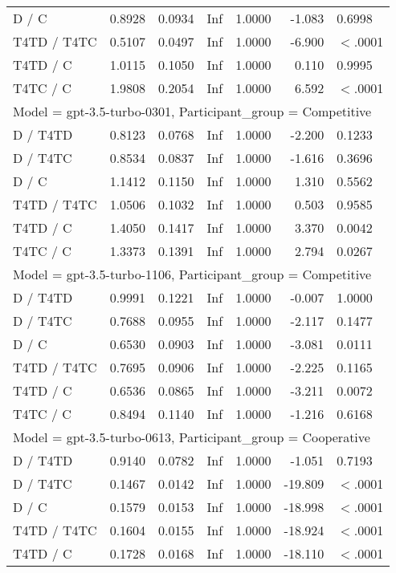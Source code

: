 \begin{table}[ht]
\begin{tabular}{lrrrrrl}
  D / C & 0.8928 & 0.0934 & Inf & 1.0000 & -1.083 & 0.6998 \\ 
  T4TD / T4TC & 0.5107 & 0.0497 & Inf & 1.0000 & -6.900 & $<$.0001 \\ 
  T4TD / C & 1.0115 & 0.1050 & Inf & 1.0000 & 0.110 & 0.9995 \\ 
  T4TC / C & 1.9808 & 0.2054 & Inf & 1.0000 & 6.592 & $<$.0001 \\ 
   \hline
\multicolumn{7}{l}{Model = gpt-3.5-turbo-0301, Participant_group = Competitive}\\
D / T4TD & 0.8123 & 0.0768 & Inf & 1.0000 & -2.200 & 0.1233 \\ 
  D / T4TC & 0.8534 & 0.0837 & Inf & 1.0000 & -1.616 & 0.3696 \\ 
  D / C & 1.1412 & 0.1150 & Inf & 1.0000 & 1.310 & 0.5562 \\ 
  T4TD / T4TC & 1.0506 & 0.1032 & Inf & 1.0000 & 0.503 & 0.9585 \\ 
  T4TD / C & 1.4050 & 0.1417 & Inf & 1.0000 & 3.370 & 0.0042 \\ 
  T4TC / C & 1.3373 & 0.1391 & Inf & 1.0000 & 2.794 & 0.0267 \\ 
   \hline
\multicolumn{7}{l}{Model = gpt-3.5-turbo-1106, Participant_group = Competitive}\\
D / T4TD & 0.9991 & 0.1221 & Inf & 1.0000 & -0.007 & 1.0000 \\ 
  D / T4TC & 0.7688 & 0.0955 & Inf & 1.0000 & -2.117 & 0.1477 \\ 
  D / C & 0.6530 & 0.0903 & Inf & 1.0000 & -3.081 & 0.0111 \\ 
  T4TD / T4TC & 0.7695 & 0.0906 & Inf & 1.0000 & -2.225 & 0.1165 \\ 
  T4TD / C & 0.6536 & 0.0865 & Inf & 1.0000 & -3.211 & 0.0072 \\ 
  T4TC / C & 0.8494 & 0.1140 & Inf & 1.0000 & -1.216 & 0.6168 \\ 
   \hline
\multicolumn{7}{l}{Model = gpt-3.5-turbo-0613, Participant_group = Cooperative}\\
D / T4TD & 0.9140 & 0.0782 & Inf & 1.0000 & -1.051 & 0.7193 \\ 
  D / T4TC & 0.1467 & 0.0142 & Inf & 1.0000 & -19.809 & $<$.0001 \\ 
  D / C & 0.1579 & 0.0153 & Inf & 1.0000 & -18.998 & $<$.0001 \\ 
  T4TD / T4TC & 0.1604 & 0.0155 & Inf & 1.0000 & -18.924 & $<$.0001 \\ 
  T4TD / C & 0.1728 & 0.0168 & Inf & 1.0000 & -18.110 & $<$.0001 \\ 

\end{tabular}
\end{table}
